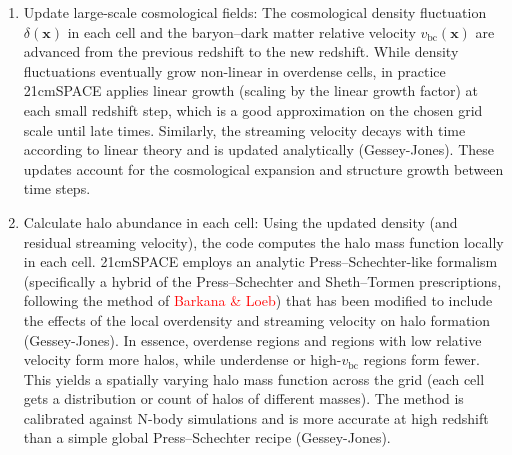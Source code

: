 \documentclass[floats,floatfix,showpacs,amssymb,prd,superscriptaddress,nofootinbib]{revtex4-2} %
\newcommand{\red}{\textcolor{red}}
\begin{document}
\begin{enumerate}
    \item Update large-scale cosmological fields: The cosmological density fluctuation $\delta(\mathbf{x})$ in each cell and the baryon–dark matter relative velocity $v_{\text{bc}}(\mathbf{x})$ are advanced from the previous redshift to the new redshift. While density fluctuations eventually grow non-linear in overdense cells, in practice 21cmSPACE applies linear growth (scaling by the linear growth factor) at each small redshift step, which is a good approximation on the chosen grid scale until late times. Similarly, the streaming velocity decays with time according to linear theory and is updated analytically (Gessey-Jones). These updates account for the cosmological expansion and structure growth between time steps.

    \item Calculate halo abundance in each cell: Using the updated density (and residual streaming velocity), the code computes the halo mass function locally in each cell. 21cmSPACE employs an analytic Press–Schechter-like formalism (specifically a hybrid of the Press–Schechter and Sheth–Tormen prescriptions, following the method of \red{Barkana \& Loeb}) that has been modified to include the effects of the local overdensity and streaming velocity on halo formation (Gessey-Jones). In essence, overdense regions and regions with low relative velocity form more halos, while underdense or high-$v_{\text{bc}}$ regions form fewer. This yields a spatially varying halo mass function across the grid (each cell gets a distribution or count of halos of different masses). The method is calibrated against N-body simulations and is more accurate at high redshift than a simple global Press–Schechter recipe (Gessey-Jones).


\end{enumerate}
\end{document}
